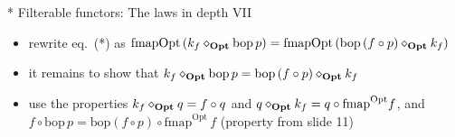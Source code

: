 \documentclass[english]{beamer}
\begin{document}
\begin{frame}{{*} Filterable functors: The laws in depth VII}
\begin{itemize}
\begin{itemize}
{\footnotesize{}$k_{f}^{A\Rightarrow1+B}=f\circ\text{id}_{\diamond_{\text{\textbf{Opt}}}}$;}
then we have $\text{fmapOpt}\left(k_{f}\right)=\text{fmap}\,k_{f}\circ\text{deflate}=\text{fmap}\:f\circ\text{fmap}\,\text{id}_{\diamond_{\text{\textbf{Opt}}}}\circ\text{deflate}=\text{fmap}\,f$
\item rewrite eq.\ ({*}) as {\footnotesize{}$\text{fmapOpt}\left(k_{f}\diamond_{\text{\textbf{Opt}}}\text{bop}\,p\right)=\text{fmapOpt}\left(\text{bop}\left(f\circ p\right)\diamond_{\text{\textbf{Opt}}}k_{f}\right)$ }{\footnotesize \par}
\item it remains to show that {\footnotesize{}$k_{f}\diamond_{\text{\textbf{Opt}}}\text{bop}\,p=\text{bop}\left(f\circ p\right)\diamond_{\text{\textbf{Opt}}}k_{f}$ }{\footnotesize \par}
\item use the properties {\footnotesize{}$k_{f}\diamond_{\text{\textbf{Opt}}}q=f\circ q$
and $q\diamond_{\text{\textbf{Opt}}}k_{f}=q\circ\text{fmap}^{\text{Opt}}f$,
and $f\circ\text{bop}\,p=\text{bop}\left(f\circ p\right)\circ\text{fmap}^{\text{Opt}}\,f$
(property from slide 11)}{\footnotesize \par}
\end{itemize}
\end{itemize}
\end{frame}
\end{document}
